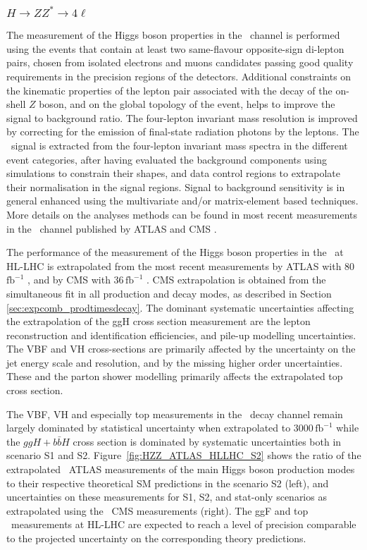 \subsubsection{$H \to ZZ^* \to 4\ell$}

The measurement of the Higgs boson properties in the \HZZ\ channel is performed using the events that contain at least two same-flavour opposite-sign di-lepton pairs, chosen from isolated electrons and muons candidates passing good quality requirements in the precision regions of the detectors. Additional constraints on the kinematic properties of the lepton pair associated with the decay of the on-shell $Z$ boson, and on the global topology of the event, helps to improve the signal to background ratio. The four-lepton invariant mass resolution is improved by correcting for the emission of final-state radiation photons by the leptons.
The \HZZ\ signal is extracted from the four-lepton invariant mass spectra in the different event categories, after having evaluated the background components using simulations to constrain their shapes, and data control regions to extrapolate their normalisation in the signal regions. Signal to background sensitivity is in general enhanced using the multivariate and/or matrix-element based techniques. More details on the analyses methods can be found in most recent measurements in the \HZZ\ channel published by ATLAS \cite{ATLAS:2018bsg} and CMS \cite{Sirunyan:2017exp}.

The performance of the measurement of the Higgs boson properties in the \HZZ\ at HL-LHC is extrapolated from the most recent measurements by ATLAS with 80\,$\mathrm{fb}^{-1}$ \cite{ATLAS:2018bsg}, and by CMS with 36\,$\mathrm{fb}^{-1}$ \cite{Sirunyan:2017exp}.
CMS extrapolation is obtained from the simultaneous fit in all production and decay modes, as described in Section \ref{sec:expcomb_prodtimesdecay}.
The dominant systematic uncertainties affecting the extrapolation of the ggH cross section measurement are the lepton reconstruction and identification efficiencies, and pile-up modelling uncertainties. The VBF and VH cross-sections are primarily affected by the uncertainty on the jet energy scale and resolution, and by the
missing higher order uncertainties.
These and
the parton shower modelling primarily affects the extrapolated top cross section.

The VBF, VH and especially top measurements in the \HZZ\ decay channel remain largely dominated by statistical uncertainty when extrapolated to 3000\,$\mathrm{fb}^{-1}$ while the $ggH+b\bar{b}H$ cross section is dominated by systematic uncertainties both in scenario S1 and S2.
%
Figure~\ref{fig:HZZ_ATLAS_HLLHC_S2} shows the ratio of the extrapolated \HZZ\ ATLAS measurements of the main Higgs boson production modes to their respective theoretical SM predictions in the scenario S2 (left), and uncertainties on these measurements for S1, S2, and stat-only scenarios as extrapolated using the \HZZ\ CMS measurements (right). The ggF and top \HZZ\ measurements at HL-LHC are expected to reach a level of precision comparable to the projected uncertainty on the corresponding theory predictions.

